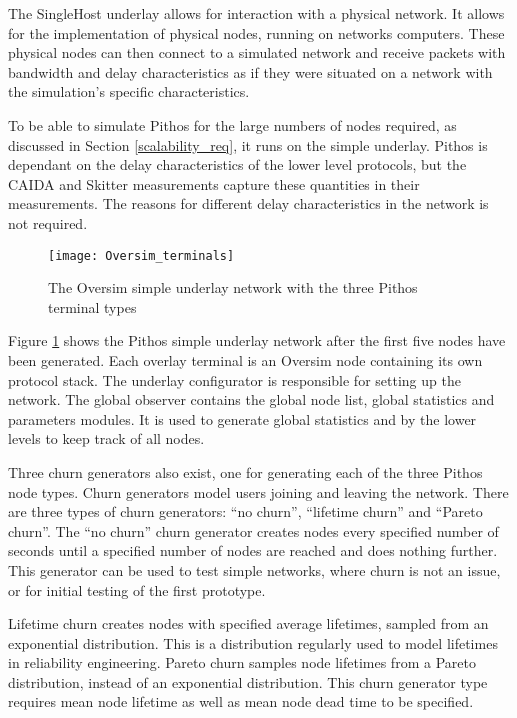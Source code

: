 The SingleHost underlay allows for interaction with a physical network. It allows for the implementation of physical nodes, running on networks computers. These physical nodes can then connect to a simulated network and receive packets with bandwidth and delay characteristics as if they were situated on a network with the simulation's specific characteristics.

To be able to simulate Pithos for the large numbers of nodes required, as discussed in Section \ref{scalability_req}, it runs on the simple underlay. Pithos is dependant on the delay characteristics of the lower level protocols, but the CAIDA and Skitter measurements capture these quantities in their measurements. The reasons for different delay characteristics in the network is not required.

\begin{figure}[htbp]
 \centering
 \texttt{[image: Oversim\_terminals]}
 \caption{The Oversim simple underlay network with the three Pithos terminal types}
 \label{fig_oversim_terminals}
\end{figure}

Figure \ref{fig_oversim_terminals} shows the Pithos simple underlay network after the first five nodes have been generated. Each overlay terminal is an Oversim node containing its own protocol stack. The underlay configurator is responsible for setting up the network. The global observer contains the global node list, global statistics and parameters modules. It is used to generate global statistics and by the lower levels to keep track of all nodes.

Three churn generators also exist, one for generating each of the three Pithos node types. Churn generators model users joining and leaving the network. There are three types of churn generators: ``no churn'', ``lifetime churn'' and ``Pareto churn''. The ``no churn'' churn generator creates nodes every specified number of seconds until a specified number of nodes are reached and does nothing further. This generator can be used to test simple networks, where churn is not an issue, or for initial testing of the first prototype.

Lifetime churn creates nodes with specified average lifetimes, sampled from an exponential distribution. This is a distribution regularly used to model lifetimes in reliability engineering. Pareto churn samples node lifetimes from a Pareto distribution, instead of an exponential distribution. This churn generator type requires mean node lifetime as well as mean node dead time to be specified.


